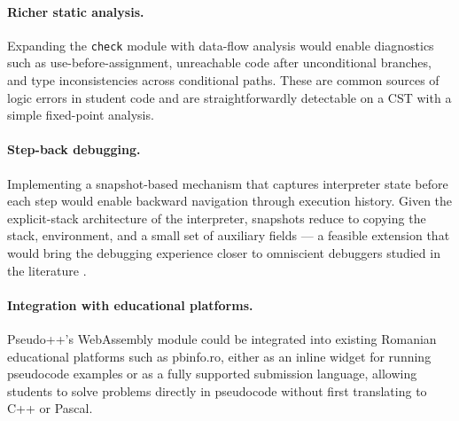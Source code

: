 \paragraph{Richer static analysis.}
Expanding the \texttt{check} module with data-flow analysis would enable
diagnostics such as use-before-assignment, unreachable code after
unconditional branches, and type inconsistencies across conditional
paths.  These are common sources of logic errors in student code and
are straightforwardly detectable on a CST with a simple fixed-point
analysis.

\paragraph{Step-back debugging.}
Implementing a snapshot-based mechanism that captures interpreter state
before each step would enable backward navigation through execution
history.  Given the explicit-stack architecture of the interpreter,
snapshots reduce to copying the stack, environment, and a small set of
auxiliary fields --- a feasible extension that would bring the debugging
experience closer to omniscient debuggers studied in the literature
\cite{lewis2003omniscient,reversible-debugging}.

\paragraph{Integration with educational platforms.}
Pseudo++'s WebAssembly module could be integrated into existing Romanian
educational platforms such as pbinfo.ro, either as an inline widget for
running pseudocode examples or as a fully supported submission language,
allowing students to solve problems directly in pseudocode without first
translating to C++ or Pascal.
